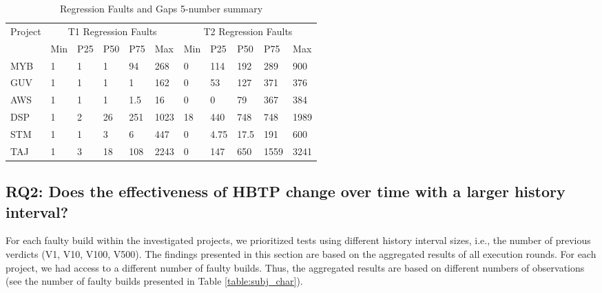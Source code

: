 \documentclass[1p]{elsarticle}
\begin{document}
\begin{table} [H]
\centering
\caption{Regression Faults and Gaps \textendash{} 5-number summary}
\label{table:five_num}
  \begin{tabular}{|l|l|l|l|l|l|l|l|l|l|l|}
    \hline
    \multirow{2}{*}{Project} &
      \multicolumn{5}{c|}{T1 Regression Faults} &
      \multicolumn{5}{c|}{T2 Regression Faults} \\
    & Min & P25 & P50 & P75 & Max & Min & P25 & P50 & P75 & Max \\
    \hline
    \hline
    MYB & 1 & 1 & 1 & 94 & 268 & 0 & 114 & 192 & 289 & 900\\
    \hline
    GUV & 1 & 1 & 1 & 1 & 162 & 0 & 53 & 127 & 371 & 376 \\
	\hline
	AWS & 1 & 1 & 1 & 1.5 & 16 & 0 & 0 & 79 & 367 & 384 \\
	\hline
	DSP & 1 & 2 & 26 & 251 & 1023 & 18 & 440 & 748 & 748 & 1989 \\
	\hline
	STM & 1 & 1 & 3 & 6 & 447 & 0 & 4.75 & 17.5 & 191 & 600 \\
	\hline
	TAJ & 1 & 3 & 18 & 108 & 2243 & 0 & 147 & 650 & 1559 & 3241 \\
	\hline	
  \end{tabular}
\end{table}


\subsection{RQ2: Does the effectiveness of HBTP change over time with a larger history interval?}

For each faulty build within the investigated projects, we prioritized tests using different history interval sizes, i.e., the number of previous verdicts (V1, V10, V100, V500). The findings presented in this section are based on the aggregated results of all execution rounds. For each project, we had access to a different number of faulty builds. Thus, the aggregated results are based on different numbers of observations (see the number of faulty builds presented in Table \ref{table:subj_char}).
\end{document}
